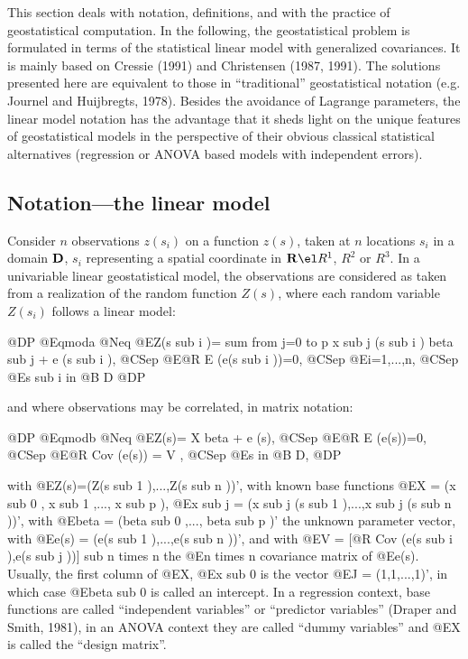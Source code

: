 \documentclass{article}
\begin{document}
This section deals with notation, definitions, and with the practice of
geostatistical computation. In the following, the geostatistical problem
is formulated in terms of the statistical linear model with generalized
covariances. It is mainly based on Cressie (1991) and Christensen (1987,
1991). The solutions presented here are equivalent to those in
``traditional'' geostatistical notation (e.g. Journel and Huijbregts,
1978). Besides the avoidance of Lagrange parameters, the linear model
notation has the advantage that it sheds light on the unique features of
geostatistical models in the perspective of their obvious classical
statistical alternatives (regression or ANOVA based models with
independent errors).


\subsection{Notation---the linear model}
Consider $n$ observations $z(s_i )$ on a function $z(s)$, taken at $n$
locations $s_i$ in a domain ${\bf D}$, $s_i$ representing a spatial
coordinate in ${\bf R} \el R^1$, $R^2$ or $R^3$. In a univariable linear
geostatistical model, the observations are considered as taken from a
realization of the random function $Z(s)$, where each random variable
$Z(s_i )$ follows a linear model:

@DP
@Eqmoda @Neq {@E{Z(s sub i )= sum from j=0 to p x sub j (s sub i )
beta sub j + e (s sub i )}, @CSep @E{@R E (e(s sub i ))=0}, @CSep
@E{i=1,...,n}, @CSep @E{s sub i in @B D}}
@DP

and where observations may be correlated, in matrix notation:

@DP
@Eqmodb @Neq { @E{Z(s)= X beta + e (s)}, @CSep @E{@R E (e(s))=0},
@CSep @E{@R Cov (e(s)) = V },
@CSep @E{s in @B D},}
@DP

with
@E{Z(s)=(Z(s sub 1 ),...,Z(s sub n ))'}, 
with known base functions @E{X = (x sub 0 , x sub 1 ,..., x sub p )},
@E{x sub j = (x sub j (s sub 1 ),...,x sub j (s sub n ))'},
with @E{beta = (beta sub 0 ,..., beta sub p )'} the unknown parameter vector,
with @E{e(s) = (e(s sub 1 ),...,e(s sub n ))'}, and with
@E{V = [@R Cov (e(s sub i ),e(s sub j ))] sub {n times n}} the
@E{n times n} covariance matrix of @E{e(s)}.
Usually, the first column of @E{X}, @E{x sub 0} is the vector
@E{J = (1,1,...,1)'}, in which case @E{beta sub 0} is called an intercept.
In a regression context, base functions are called ``independent
variables'' or ``predictor variables'' (Draper and Smith, 1981), in an
ANOVA context they are called ``dummy variables'' and @E{X} is called the
``design matrix''.
\end{document}
